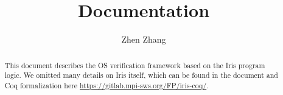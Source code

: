 \documentclass[10pt]{article}
\title{\bfseries \irisc{} Documentation}
\author{Zhen Zhang}
\begin{document}
\maketitle
\thispagestyle{empty}
\vfill
\begin{abstract}
This document describes the OS verification framework based on the Iris program logic. 
We omitted many details on Iris itself,
which can be found in the document and Coq formalization here \url{https://gitlab.mpi-sws.org/FP/iris-coq/}.
\end{abstract}

\clearpage
\tableofcontents
\clearpage

\begingroup

\endgroup
\clearpage

\begingroup

\endgroup
\clearpage

\begingroup

\endgroup
\clearpage

\begingroup

\endgroup
\clearpage

\begingroup

\endgroup
\clearpage
\end{document}
